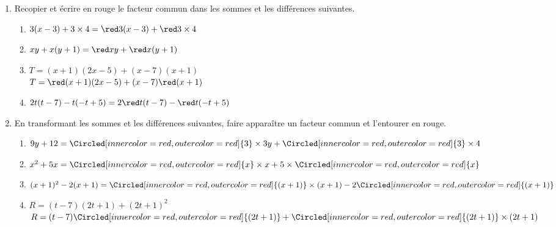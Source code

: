 \begin{corrige}
    \begin{enumerate}
        \item Recopier et écrire en rouge le facteur commun dans les sommes et les différences suivantes.
        \begin{enumerate}
            \item $3(x-3)+3\times 4 = {\red 3}(x-3)+{\red 3}\times 4$
            \item $xy+x(y+1) = {\red x}y+{\red x}(y+1)$
            \item $T=(x+1)(2x-5)+(x-7)(x+1)$\\ $T ={\red (x+1)}(2x-5)+(x-7){\red (x+1)}$
            \item $2t(t-7)-t(-t+5) = 2{\red t}(t-7)-{\red t}(-t+5)$
        \end{enumerate}
        \setcounter{enumi}{1}
        \item En transformant les sommes et les différences suivantes, faire apparaître un facteur commun et l'entourer en rouge.
        
        \begin{enumerate}
            \item $9y+12 = \Circled[inner color=red,outer color=red]{3}\times 3y+\Circled[inner color=red,outer color=red]{3}\times 4$
            \item $x^2+5x = \Circled[inner color=red,outer color=red]{x}\times x+5\times \Circled[inner color=red,outer color=red]{x}$
            \item $(x+1)^2-2(x+1) = \Circled[inner color=red,outer color=red]{(x+1)}\times (x+1)-2\Circled[inner color=red,outer color=red]{(x+1)}$
            \item $R = (t-7)(2t+1)+(2t+1)^2$\\ $R = (t-7)\Circled[inner color=red,outer color=red]{(2t+1)}+\Circled[inner color=red,outer color=red]{(2t+1)}\times (2t+1)$
        \end{enumerate}
    \end{enumerate}
\end{corrige}

